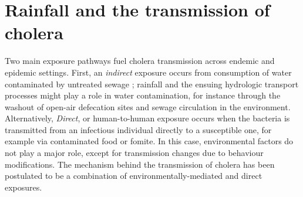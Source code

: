 \section{Rainfall and the transmission of cholera}\label{sec:rainfall-cholera-transmission}
Two main exposure pathways fuel cholera transmission across endemic and epidemic settings.
First, an \textit{indirect} exposure occurs from consumption of water contaminated by untreated sewage%
; rainfall and the ensuing hydrologic transport processes might play a role in water contamination, for instance through the washout of open-air defecation sites and sewage circulation in the environment.
Alternatively, \textit{Direct}, or human-to-human exposure occurs when the bacteria is transmitted from an infectious individual directly to a susceptible one, for example via contaminated food or fomite. In this case, environmental factors do not play a major role, except for transmission changes due to behaviour modifications.
The mechanism behind the transmission of cholera has been postulated to be a combination of environmentally-mediated and direct exposures.
